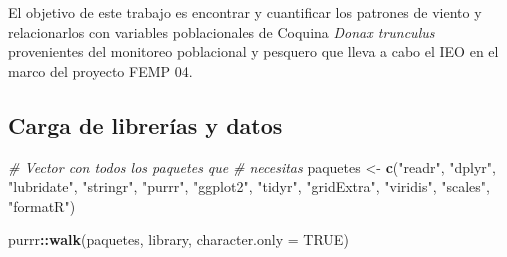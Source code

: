 \documentclass[
]{article}
\newenvironment{Shaded}{\begin{snugshade}}{\end{snugshade}}
\newcommand{\AttributeTok}[1]{\textcolor[rgb]{0.13,0.29,0.53}{#1}}
\newcommand{\CommentTok}[1]{\textcolor[rgb]{0.56,0.35,0.01}{\textit{#1}}}
\newcommand{\ConstantTok}[1]{\textcolor[rgb]{0.56,0.35,0.01}{#1}}
\newcommand{\FunctionTok}[1]{\textcolor[rgb]{0.13,0.29,0.53}{\textbf{#1}}}
\newcommand{\NormalTok}[1]{#1}
\newcommand{\OtherTok}[1]{\textcolor[rgb]{0.56,0.35,0.01}{#1}}
\newcommand{\SpecialCharTok}[1]{\textcolor[rgb]{0.81,0.36,0.00}{\textbf{#1}}}
\newcommand{\StringTok}[1]{\textcolor[rgb]{0.31,0.60,0.02}{#1}}
\begin{document}
El objetivo de este trabajo es encontrar y cuantificar los patrones de viento y relacionarlos con variables poblacionales de Coquina \emph{Donax trunculus} provenientes del monitoreo poblacional y pesquero que lleva a cabo el IEO en el marco del proyecto FEMP 04.

\subsection{Carga de librerías y datos}\label{carga-de-libreruxedas-y-datos}

\begin{Shaded}
\begin{Highlighting}[]
\CommentTok{\# Vector con todos los paquetes que}
\CommentTok{\# necesitas}
\NormalTok{paquetes }\OtherTok{\textless{}{-}} \FunctionTok{c}\NormalTok{(}\StringTok{"readr"}\NormalTok{, }\StringTok{"dplyr"}\NormalTok{, }\StringTok{"lubridate"}\NormalTok{,}
    \StringTok{"stringr"}\NormalTok{, }\StringTok{"purrr"}\NormalTok{, }\StringTok{"ggplot2"}\NormalTok{, }\StringTok{"tidyr"}\NormalTok{,}
    \StringTok{"gridExtra"}\NormalTok{, }\StringTok{"viridis"}\NormalTok{, }\StringTok{"scales"}\NormalTok{, }\StringTok{"formatR"}\NormalTok{)}

\NormalTok{purrr}\SpecialCharTok{::}\FunctionTok{walk}\NormalTok{(paquetes, library, }\AttributeTok{character.only =} \ConstantTok{TRUE}\NormalTok{)}
\end{Highlighting}
\end{Shaded}
\end{document}
